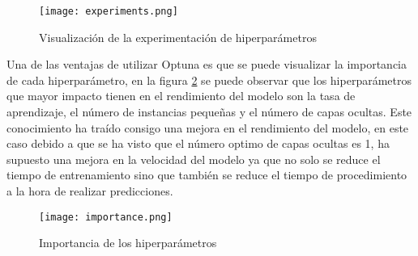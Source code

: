 \begin{figure}[ht]
    \centering
    \texttt{[image: experiments.png]}
    \caption{Visualización de la experimentación de hiperparámetros}
    \label{fig:experiments}
\end{figure}

Una de las ventajas de utilizar Optuna es que se puede visualizar la importancia de cada
hiperparámetro, en la figura \ref{fig:importance} se puede observar que los hiperparámetros
que mayor impacto tienen en el rendimiento del modelo son la tasa de aprendizaje, el número
de instancias pequeñas y el número de capas ocultas. Este conocimiento ha traído consigo
una mejora en el rendimiento del modelo, en este caso debido a que se ha visto que el
número optimo de capas ocultas es 1, ha supuesto una mejora en la velocidad del modelo
ya que no solo se reduce el tiempo de entrenamiento sino que también se reduce el tiempo
de procedimiento a la hora de realizar predicciones.

\begin{figure}[ht!]
    \centering
    \texttt{[image: importance.png]}
    \caption{Importancia de los hiperparámetros}
    \label{fig:importance}
\end{figure}
